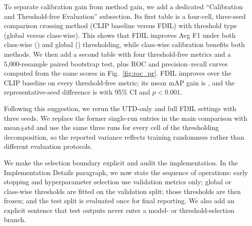 {To separate calibration gain from method gain, we add a dedicated ``Calibration and Threshold-free Evaluation'' subsection. Its first table is a four-cell, three-seed comparison crossing method (CLIP baseline versus FDIL) with threshold type (global versus class-wise). This shows that FDIL improves Avg F1 under both class-wise () and global () thresholding, while class-wise calibration benefits both methods. We then add a second table with four threshold-free metrics and a 5,000-resample paired bootstrap test, plus ROC and precision--recall curves computed from the same scores in Fig.~\ref{fig:roc_pr}. FDIL improves over the CLIP baseline on every threshold-free metric; its mean mAP gain is , and the representative-seed difference is  with 95\% CI \res{$[3.58,6.10]$} and $p<0.001$.
}
\showThresholdingTest
\showThresholdFree
\showRocPr

{Following this suggestion, we rerun the UTD-only and full FDIL settings with three seeds. We replace the former single-run entries in the main comparison with mean$\pm$std and use the same three runs for every cell of the thresholding decomposition, so the reported variance reflects training randomness rather than different evaluation protocols.
}
\showMainResults
\showThresholdingTest

{We make the selection boundary explicit and audit the implementation. In the Implementation Details paragraph, we now state the sequence of operations: early stopping and hyperparameter selection use validation metrics only; global or class-wise thresholds are fitted on the validation split; those thresholds are then frozen; and the test split is evaluated once for final reporting. We also add an explicit sentence that test outputs never enter a model- or threshold-selection branch.
}

